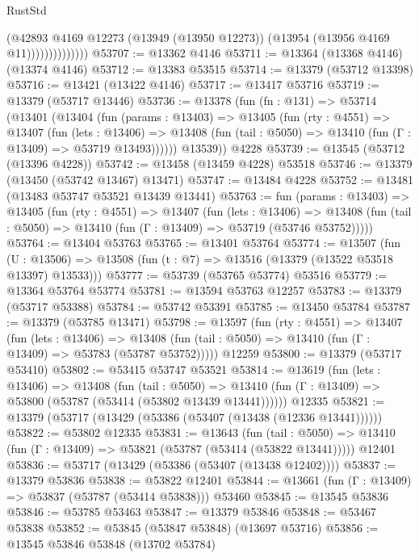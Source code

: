 \begin{lexlean}{RustStd}
\begin{coremodule}
                          (@42893
                            @4169
                            @12273
                            (@13949 (@13950 @12273))
                            (@13954 (@13956 @4169 @11))))))))))))))
@53707 := @13362 @4146
@53711 := @13364 (@13368 @4146) (@13374 @4146)
@53712 := @13383 @53515
@53714 := @13379 (@53712 @13398)
@53716 := @13421 (@13422 @4146)
@53717 := @13417 @53716
@53719 := @13379 (@53717 @13446)
@53736 := @13378
    (fun (fn : @131) =>
    @53714
      (@13401
        (@13404
          (fun (params : @13403) =>
          @13405
            (fun (rty : @4551) =>
            @13407
              (fun (lets : @13406) =>
              @13408 (fun (tail : @5050) => @13410 (fun (Γ : @13409) => @53719 @13493))))))
        @13539))
    @4228
@53739 := @13545 (@53712 (@13396 @4228))
@53742 := @13458 (@13459 @4228) @53518
@53746 := @13379 (@13450 (@53742 @13467) @13471)
@53747 := @13484 @4228
@53752 := @13481 (@13483 @53747 @53521 @13439 @13441)
@53763 := fun (params : @13403) =>
  @13405
    (fun (rty : @4551) =>
    @13407
      (fun (lets : @13406) =>
      @13408 (fun (tail : @5050) => @13410 (fun (Γ : @13409) => @53719 (@53746 @53752)))))
@53764 := @13404 @53763
@53765 := @13401 @53764
@53774 := @13507
    (fun (U : @13506) => @13508 (fun (t : @7) => @13516 (@13379 (@13522 @53518 @13397) @13533)))
@53777 := @53739 (@53765 @53774) @53516
@53779 := @13364 @53764 @53774
@53781 := @13594 @53763 @12257
@53783 := @13379 (@53717 @53388)
@53784 := @53742 @53391
@53785 := @13450 @53784
@53787 := @13379 (@53785 @13471)
@53798 := @13597
    (fun (rty : @4551) =>
    @13407
      (fun (lets : @13406) =>
      @13408 (fun (tail : @5050) => @13410 (fun (Γ : @13409) => @53783 (@53787 @53752)))))
    @12259
@53800 := @13379 (@53717 @53410)
@53802 := @53415 @53747 @53521
@53814 := @13619
    (fun (lets : @13406) =>
    @13408
      (fun (tail : @5050) =>
      @13410 (fun (Γ : @13409) => @53800 (@53787 (@53414 (@53802 @13439 @13441))))))
    @12335
@53821 := @13379 (@53717 (@13429 (@53386 (@53407 (@13438 (@12336 @13441))))))
@53822 := @53802 @12335
@53831 := @13643
    (fun (tail : @5050) => @13410 (fun (Γ : @13409) => @53821 (@53787 (@53414 (@53822 @13441)))))
    @12401
@53836 := @53717 (@13429 (@53386 (@53407 (@13438 @12402))))
@53837 := @13379 @53836
@53838 := @53822 @12401
@53844 := @13661 (fun (Γ : @13409) => @53837 (@53787 (@53414 @53838))) @53460
@53845 := @13545 @53836
@53846 := @53785 @53463
@53847 := @13379 @53846
@53848 := @53467 @53838
@53852 := @53845 (@53847 @53848) (@13697 @53716)
@53856 := @13545 @53846 @53848 (@13702 @53784)

\end{coremodule}
\end{lexlean}
